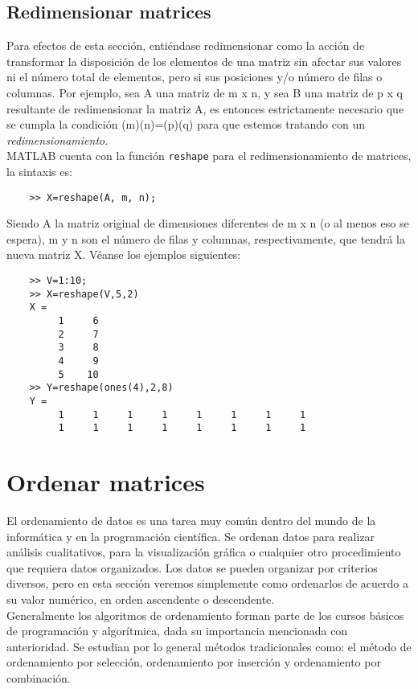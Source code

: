 \subsection{Redimensionar matrices}

Para efectos de esta sección, entiéndase redimensionar como la acción de transformar 
la disposición de los elementos de una matriz sin afectar sus valores ni el número total 
de elementos, pero si sus posiciones y/o número de filas o columnas. Por ejemplo, sea 
A una matriz de m x n, y sea B una matriz de p x q resultante de redimensionar la 
matriz A, es entonces estrictamente necesario que se cumpla la condición (m)(n)=(p)(q) 
para que estemos tratando con un \textit{redimensionamiento}.\\

MATLAB cuenta con la función \texttt{reshape} para el redimensionamiento de matrices, la sintaxis es:

\begin{verbatim}
	>> X=reshape(A, m, n);
\end{verbatim}

Siendo A la matriz original de dimensiones diferentes de m x n (o al menos eso se espera), 
m y n son el número de filas y columnas, respectivamente, que tendrá la nueva matriz X. 
Véanse los ejemplos siguientes:

\begin{verbatim}
	>> V=1:10;
	>> X=reshape(V,5,2)
	X =
	     1     6
	     2     7
	     3     8
	     4     9
	     5    10
	>> Y=reshape(ones(4),2,8)
	Y =
	     1     1     1     1     1     1     1     1
	     1     1     1     1     1     1     1     1
\end{verbatim}


\section{Ordenar matrices}
 
El ordenamiento de datos es una tarea muy común dentro del mundo de la informática y 
en la programación científica. Se ordenan datos para realizar análisis cualitativos, 
para la visualización gráfica o cualquier otro procedimiento que requiera datos organizados. 
Los datos se pueden organizar por criterios diversos, pero en esta sección veremos 
simplemente como ordenarlos de acuerdo a su valor numérico, en orden ascendente o descendente.\\

Generalmente los algoritmos de ordenamiento forman parte de los cursos básicos de 
programación y algorítmica, dada su importancia mencionada con anterioridad. 
Se estudian por lo general métodos tradicionales como: el método de ordenamiento 
por selección, ordenamiento por inserción y ordenamiento por combinación.\\

